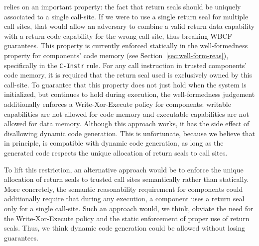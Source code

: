 \begin{jversion}
  \stktokens{} relies on an important property: the fact that return seals should be uniquely associated to a single call-site.
  If we were to use a single return seal for multiple call sites, that would allow an adversary to combine a valid return data capability with a return code capability for the wrong call-site, thus breaking WBCF guarantees.
  This property is currently enforced statically in the well-formedness property for components' code memory (see Section~\ref{sec:well-form-reas}), specifically in the \texttt{C-Instr} rule.
  For any call instruction in trusted components' code memory, it is required that the return seal used is exclusively owned by this call-site.
  To guarantee that this property does not just hold when the system is initialized, but continues to hold during execution, the well-formedness judgement additionally enforces a Write-Xor-Execute policy for components:
  writable capabilities are not allowed for code memory and executable capabilities are not allowed for data memory.
  Although this approach works, it has the side effect of disallowing dynamic code generation.
  This is unfortunate, because we believe that in principle, \stktokens{} is compatible with dynamic code generation, as long as the generated code respects the unique allocation of return seals to call sites.

  To lift this restriction, an alternative approach would be to enforce the unique allocation of return seals to trusted call sites semantically rather than statically.
  More concretely, the semantic reasonability requirement for components could additionally require that during any execution, a component uses a return seal only for a single call-site.
  Such an approach would, we think, obviate the need for the Write-Xor-Execute policy and the static enforcement of proper use of return seals.
  Thus, we think dynamic code generation could be allowed without losing \stktokens{} guarantees.
\end{jversion}

